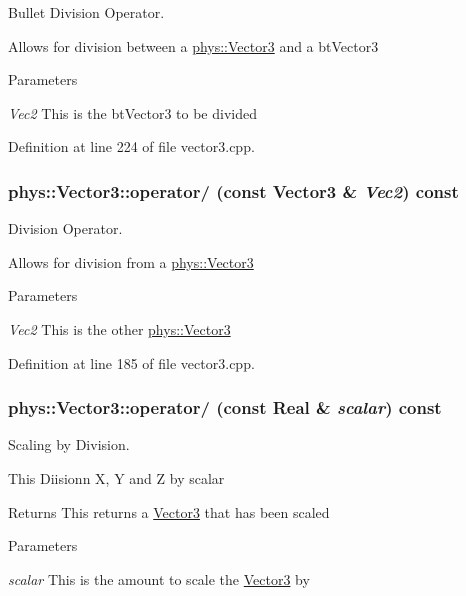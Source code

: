 Bullet Division Operator. 

Allows for division between a \hyperlink{classphys_1_1Vector3}{phys::Vector3} and a btVector3 
\begin{DoxyParams}{Parameters}
\item[{\em Vec2}]This is the btVector3 to be divided \end{DoxyParams}


Definition at line 224 of file vector3.cpp.

\hypertarget{classphys_1_1Vector3_af8db5066a9509a5d1b7d568ef576dc6e}{
\subsubsection[{operator/}]{ phys::Vector3::operator/ (const {\bf Vector3} \& {\em Vec2}) const}}
\label{d5/d6a/classphys_1_1Vector3_af8db5066a9509a5d1b7d568ef576dc6e}


Division Operator. 

Allows for division from a \hyperlink{classphys_1_1Vector3}{phys::Vector3} 
\begin{DoxyParams}{Parameters}
\item[{\em Vec2}]This is the other \hyperlink{classphys_1_1Vector3}{phys::Vector3} \end{DoxyParams}


Definition at line 185 of file vector3.cpp.

\hypertarget{classphys_1_1Vector3_a4bb5377ad78c299b40a8bc9fb66a902f}{
\subsubsection[{operator/}]{ phys::Vector3::operator/ (const {\bf Real} \& {\em scalar}) const}}
\label{d5/d6a/classphys_1_1Vector3_a4bb5377ad78c299b40a8bc9fb66a902f}


Scaling by Division. 

This Diisionn X, Y and Z by scalar \begin{DoxyReturn}{Returns}
This returns a \hyperlink{classphys_1_1Vector3}{Vector3} that has been scaled 
\end{DoxyReturn}

\begin{DoxyParams}{Parameters}
\item[{\em scalar}]This is the amount to scale the \hyperlink{classphys_1_1Vector3}{Vector3} by \end{DoxyParams}


